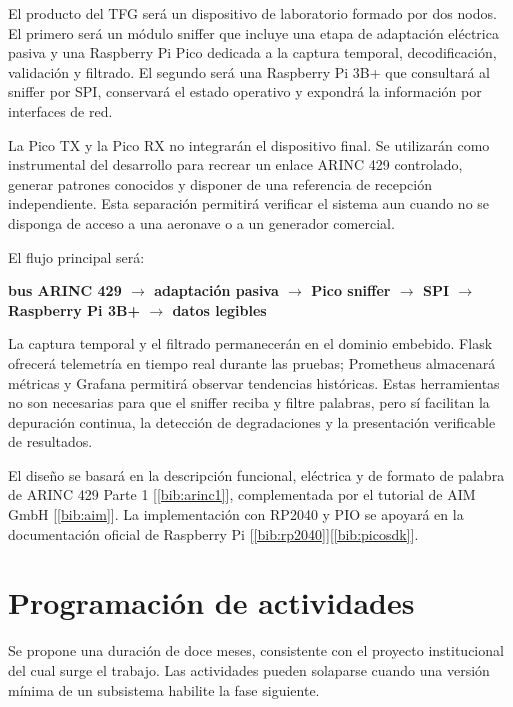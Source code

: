\documentclass[12pt,a4paper,oneside]{article}
\newcommand{\citeref}[1]{[\ref{#1}]}
\begin{document}
El producto del TFG será un dispositivo de laboratorio formado por dos nodos. El primero será un módulo sniffer que incluye una etapa de adaptación eléctrica pasiva y una Raspberry Pi Pico dedicada a la captura temporal, decodificación, validación y filtrado. El segundo será una Raspberry Pi 3B+ que consultará al sniffer por SPI, conservará el estado operativo y expondrá la información por interfaces de red.

La Pico TX y la Pico RX no integrarán el dispositivo final. Se utilizarán como instrumental del desarrollo para recrear un enlace ARINC 429 controlado, generar patrones conocidos y disponer de una referencia de recepción independiente. Esta separación permitirá verificar el sistema aun cuando no se disponga de acceso a una aeronave o a un generador comercial.

El flujo principal será:

\begin{center}
\textbf{bus ARINC 429 $\rightarrow$ adaptación pasiva $\rightarrow$ Pico sniffer $\rightarrow$ SPI $\rightarrow$ Raspberry Pi 3B+ $\rightarrow$ datos legibles}
\end{center}

La captura temporal y el filtrado permanecerán en el dominio embebido. Flask ofrecerá telemetría en tiempo real durante las pruebas; Prometheus almacenará métricas y Grafana permitirá observar tendencias históricas. Estas herramientas no son necesarias para que el sniffer reciba y filtre palabras, pero sí facilitan la depuración continua, la detección de degradaciones y la presentación verificable de resultados.

El diseño se basará en la descripción funcional, eléctrica y de formato de palabra de ARINC 429 Parte 1 \citeref{bib:arinc1}, complementada por el tutorial de AIM GmbH \citeref{bib:aim}. La implementación con RP2040 y PIO se apoyará en la documentación oficial de Raspberry Pi \citeref{bib:rp2040}\citeref{bib:picosdk}.

\section{Programación de actividades}

Se propone una duración de doce meses, consistente con el proyecto institucional del cual surge el trabajo. Las actividades pueden solaparse cuando una versión mínima de un subsistema habilite la fase siguiente.
\end{document}
